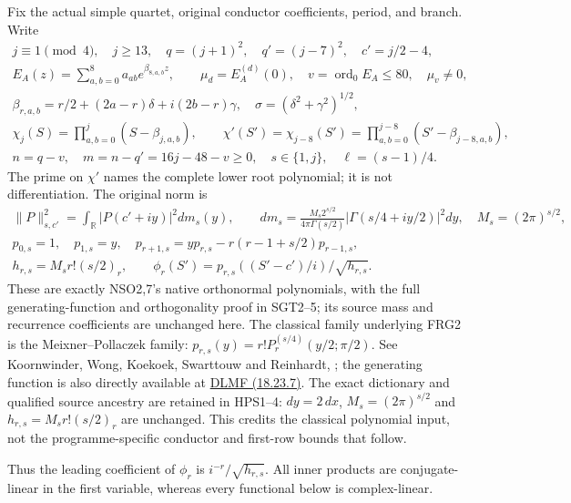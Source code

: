 \documentclass[11pt,a4paper]{article}
\begin{document}
Fix the actual simple quartet, original conductor coefficients, period,
and branch. Write
\[
\begin{gathered}
j\equiv1\pmod4,\quad j\ge13,\quad q=(j+1)^2,\quad q'=(j-7)^2,
\quad c'=j/2-4,\\
E_A(z)=\sum_{a,b=0}^8a_{ab}e^{\beta_{8,a,b}z},\qquad
\mu_d=E_A^{(d)}(0),\quad v=\operatorname{ord}_0E_A\le80,
\quad\mu_v\ne0,\\
\beta_{r,a,b}=r/2+(2a-r)\delta+i(2b-r)\gamma,\quad
\sigma=(\delta^2+\gamma^2)^{1/2},\\
\chi_j(S)=\prod_{a,b=0}^j(S-\beta_{j,a,b}),\qquad
\chi'(S')=\chi_{j-8}(S')=\prod_{a,b=0}^{j-8}(S'-\beta_{j-8,a,b}),\\
n=q-v,\quad m=n-q'=16j-48-v\ge0,
\quad s\in\{1,j\},\quad \ell=(s-1)/4.
\end{gathered}\tag{FRG1}
\]
The prime on $\chi'$ names the complete lower root polynomial; it is
not differentiation. The original norm is
\[
\begin{gathered}
\|P\|_{s,c'}^2=\int_{\mathbb R}|P(c'+iy)|^2dm_s(y),\qquad
dm_s=\frac{M_s2^{s/2}}{4\pi\Gamma(s/2)}
 |\Gamma(s/4+iy/2)|^2dy,\quad M_s=(2\pi)^{s/2},\\
p_{0,s}=1,\quad p_{1,s}=y,\quad
p_{r+1,s}=yp_{r,s}-r(r-1+s/2)p_{r-1,s},\\
h_{r,s}=M_sr!(s/2)_r,\qquad
\phi_r(S')=p_{r,s}((S'-c')/i)/\sqrt{h_{r,s}}.
\end{gathered}\tag{FRG2}
\]
These are exactly NSO2,7's native orthonormal polynomials, with the
full generating-function and orthogonality proof in SGT2--5; its
source mass and recurrence coefficients are unchanged here.
The classical family underlying FRG2 is the Meixner--Pollaczek family:
$p_{r,s}(y)=r!P_r^{(s/4)}(y/2;\pi/2)$.
See Koornwinder, Wong, Koekoek, Swarttouw and Reinhardt,
\cite[eqs.~(18.19.6)--(18.19.9), (18.22.8), (18.23.7)]{human:dlmf18};
the generating function is also directly available at
\href{https://dlmf.nist.gov/18.23#E7}{DLMF (18.23.7)}.
The exact dictionary and qualified source ancestry are retained in HPS1--4:
$dy=2\,dx$, $M_s=(2\pi)^{s/2}$ and
$h_{r,s}=M_sr!(s/2)_r$ are unchanged.
This credits the classical polynomial input, not the programme-specific
conductor and first-row bounds that follow.

Thus the leading coefficient of $\phi_r$ is
$i^{-r}/\sqrt{h_{r,s}}$. All inner products are conjugate-linear
in the first variable, whereas every functional below is complex-linear.
\end{document}
